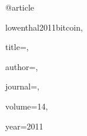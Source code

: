 @article{lowenthal2011bitcoin,

 title={},

 author={},

 journal={},

 volume={14},

 year={2011}

}



%
